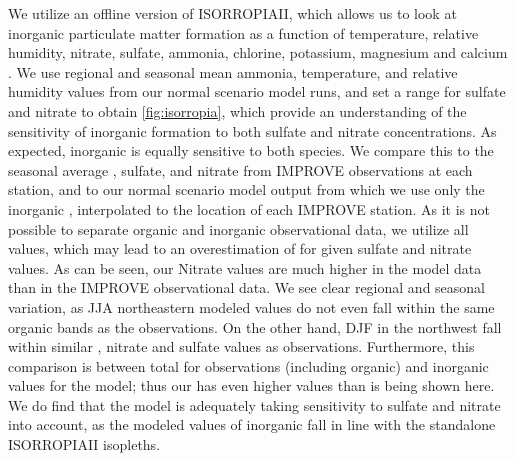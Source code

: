 \documentclass[12]{article}
\begin{document}
We utilize an offline version of ISORROPIAII, which allows us to look at inorganic particulate matter formation as a function of temperature, relative humidity, nitrate, sulfate, ammonia, chlorine, potassium, magnesium and calcium \citep{fountoukis_isorropia_2007}. We use regional and seasonal mean ammonia, temperature, and relative humidity values from our normal scenario model runs, and set a range for sulfate and nitrate to obtain \ref{fig:isorropia}, which provide an understanding of the sensitivity of inorganic  formation to both sulfate and nitrate concentrations. As expected, inorganic  is equally sensitive to both species. We compare this to the seasonal average , sulfate, and nitrate from IMPROVE observations at each station, and to our normal scenario model output from which we use only the inorganic , interpolated to the location of each IMPROVE station. As it is not possible to separate organic and inorganic observational  data, we utilize all values, which may lead to an overestimation of  for given sulfate and nitrate values. As can be seen, our Nitrate values are much higher in the model data than in the IMPROVE observational data. We see clear regional and seasonal variation, as JJA northeastern modeled values do not even fall within the same organic  bands as the observations. On the other hand, DJF in the northwest fall within similar , nitrate and sulfate values as observations. Furthermore, this comparison is between total  for observations (including organic) and inorganic  values for the model; thus our  has even higher values than is being shown here. We do find that the model is adequately taking sensitivity to sulfate and nitrate into account, as the modeled values of inorganic  fall in line with the standalone ISORROPIAII isopleths.
\end{document}
